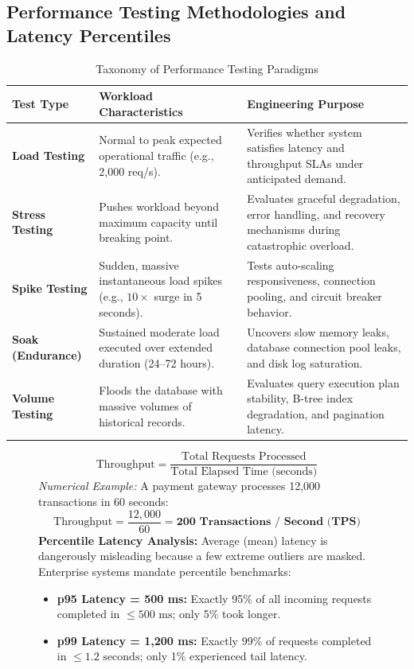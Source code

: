\subsection{Performance Testing Methodologies and Latency Percentiles}
\begin{table}[htbp]
\centering
\small
\caption{Taxonomy of Performance Testing Paradigms}
\label{tab:performance_testing}
\begin{tabularx}{\textwidth}{l p{4cm} X}
\toprule
\textbf{Test Type} & \textbf{Workload Characteristics} & \textbf{Engineering Purpose} \\
\midrule
\textbf{Load Testing} & Normal to peak expected operational traffic (e.g., 2,000 req/s). & Verifies whether system satisfies latency and throughput SLAs under anticipated demand. \\
\textbf{Stress Testing} & Pushes workload beyond maximum capacity until breaking point. & Evaluates graceful degradation, error handling, and recovery mechanisms during catastrophic overload. \\
\textbf{Spike Testing} & Sudden, massive instantaneous load spikes (e.g., $10\times$ surge in 5 seconds). & Tests auto-scaling responsiveness, connection pooling, and circuit breaker behavior. \\
\textbf{Soak (Endurance)} & Sustained moderate load executed over extended duration (24--72 hours). & Uncovers slow memory leaks, database connection pool leaks, and disk log saturation. \\
\textbf{Volume Testing} & Floods the database with massive volumes of historical records. & Evaluates query execution plan stability, B-tree index degradation, and pagination latency. \\
\bottomrule
\end{tabularx}
\end{table}

\begin{figure}[htbp]
\centering
\begin{tcolorbox}[colback=codebg, colframe=primary, title=\textbf{Throughput Formulation and Percentile Latency Interpretation}]
\begin{equation}
\boxed{\text{Throughput} = \frac{\text{Total Requests Processed}}{\text{Total Elapsed Time (seconds)}}}
\end{equation}
\textit{Numerical Example:} A payment gateway processes 12,000 transactions in 60 seconds:
\[
\text{Throughput} = \frac{12,000}{60} = \mathbf{200\text{ Transactions / Second (TPS)}}
\]
\textbf{Percentile Latency Analysis:} Average (mean) latency is dangerously misleading because a few extreme outliers are masked. Enterprise systems mandate percentile benchmarks:
\begin{itemize}
    \item \textbf{p95 Latency = 500 ms:} Exactly 95\% of all incoming requests completed in $\le 500\text{ ms}$; only 5\% took longer.
    \item \textbf{p99 Latency = 1,200 ms:} Exactly 99\% of requests completed in $\le 1.2\text{ seconds}$; only 1\% experienced tail latency.
\end{itemize}
\end{tcolorbox}
\end{figure}

